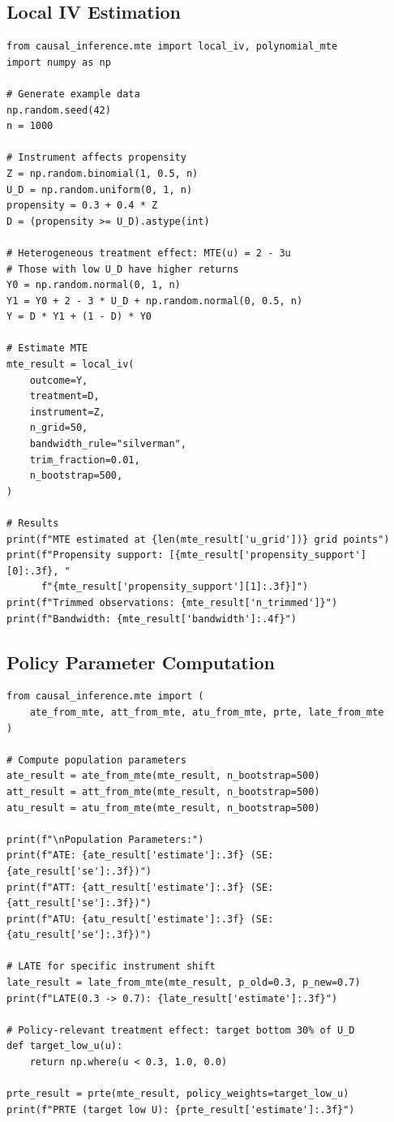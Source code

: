 \subsection{Local IV Estimation}

\begin{verbatim}
from causal_inference.mte import local_iv, polynomial_mte
import numpy as np

# Generate example data
np.random.seed(42)
n = 1000

# Instrument affects propensity
Z = np.random.binomial(1, 0.5, n)
U_D = np.random.uniform(0, 1, n)
propensity = 0.3 + 0.4 * Z
D = (propensity >= U_D).astype(int)

# Heterogeneous treatment effect: MTE(u) = 2 - 3u
# Those with low U_D have higher returns
Y0 = np.random.normal(0, 1, n)
Y1 = Y0 + 2 - 3 * U_D + np.random.normal(0, 0.5, n)
Y = D * Y1 + (1 - D) * Y0

# Estimate MTE
mte_result = local_iv(
    outcome=Y,
    treatment=D,
    instrument=Z,
    n_grid=50,
    bandwidth_rule="silverman",
    trim_fraction=0.01,
    n_bootstrap=500,
)

# Results
print(f"MTE estimated at {len(mte_result['u_grid'])} grid points")
print(f"Propensity support: [{mte_result['propensity_support'][0]:.3f}, "
      f"{mte_result['propensity_support'][1]:.3f}]")
print(f"Trimmed observations: {mte_result['n_trimmed']}")
print(f"Bandwidth: {mte_result['bandwidth']:.4f}")
\end{verbatim}

\subsection{Policy Parameter Computation}

\begin{verbatim}
from causal_inference.mte import (
    ate_from_mte, att_from_mte, atu_from_mte, prte, late_from_mte
)

# Compute population parameters
ate_result = ate_from_mte(mte_result, n_bootstrap=500)
att_result = att_from_mte(mte_result, n_bootstrap=500)
atu_result = atu_from_mte(mte_result, n_bootstrap=500)

print(f"\nPopulation Parameters:")
print(f"ATE: {ate_result['estimate']:.3f} (SE: {ate_result['se']:.3f})")
print(f"ATT: {att_result['estimate']:.3f} (SE: {att_result['se']:.3f})")
print(f"ATU: {atu_result['estimate']:.3f} (SE: {atu_result['se']:.3f})")

# LATE for specific instrument shift
late_result = late_from_mte(mte_result, p_old=0.3, p_new=0.7)
print(f"LATE(0.3 -> 0.7): {late_result['estimate']:.3f}")

# Policy-relevant treatment effect: target bottom 30% of U_D
def target_low_u(u):
    return np.where(u < 0.3, 1.0, 0.0)

prte_result = prte(mte_result, policy_weights=target_low_u)
print(f"PRTE (target low U): {prte_result['estimate']:.3f}")
\end{verbatim}

